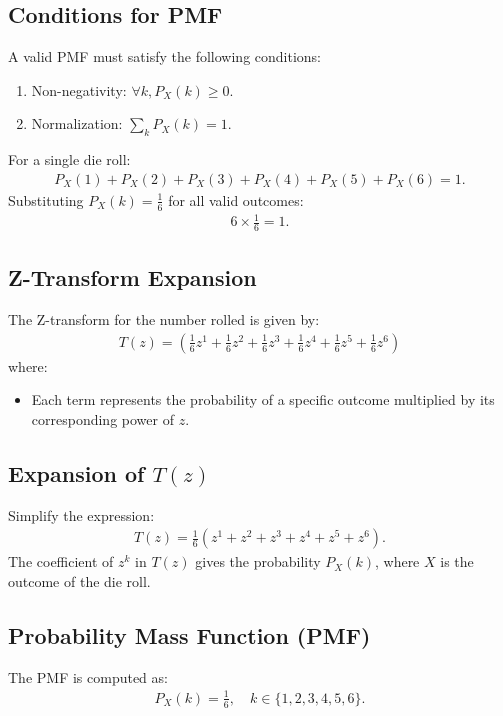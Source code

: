 \documentclass[journal]{IEEEtran}
\begin{document}
	\subsection*{Conditions for PMF}
	A valid PMF must satisfy the following conditions:
	\begin{enumerate}
		\item Non-negativity: \(\forall k, P_X(k) \geq 0\).
		\item Normalization: \(\sum_{k} P_X(k) = 1\).
	\end{enumerate}
	For a single die roll:
	\begin{align}
		P_X(1) + P_X(2) + P_X(3) + P_X(4) + P_X(5) + P_X(6) = 1.
	\end{align}
	Substituting \(P_X(k) = \frac{1}{6}\) for all valid outcomes:
	\begin{align}
		6 \times \frac{1}{6} = 1.
	\end{align}
	
	\subsection*{Z-Transform Expansion}
	The Z-transform for the number rolled is given by:
	\begin{align}
		T(z) = \left( \frac{1}{6}z^1 + \frac{1}{6}z^2 + \frac{1}{6}z^3 + \frac{1}{6}z^4 + \frac{1}{6}z^5 + \frac{1}{6}z^6 \right)
	\end{align}
	where:
	\begin{itemize}
		\item Each term represents the probability of a specific outcome multiplied by its corresponding power of \(z\).
	\end{itemize}
	
	\subsection*{Expansion of \(T(z)\)}
	Simplify the expression:
	\begin{align}
		T(z) = \frac{1}{6}(z^1 + z^2 + z^3 + z^4 + z^5 + z^6).
	\end{align}
	The coefficient of \(z^k\) in \(T(z)\) gives the probability \(P_X(k)\), where \(X\) is the outcome of the die roll.
	
	\subsection*{Probability Mass Function (PMF)}
	The PMF is computed as:
	\begin{align}
		P_X(k) = \frac{1}{6}, \quad k \in \{1, 2, 3, 4, 5, 6\}.
	\end{align}
	
\end{document}
